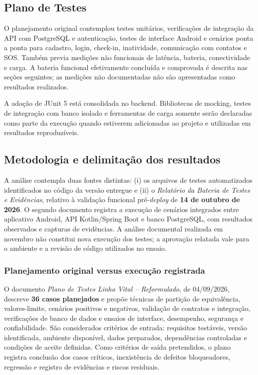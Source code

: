 \subsection{Plano de Testes}

O planejamento original contemplou testes unitários, verificações de integração da API com PostgreSQL e autenticação, testes de interface Android e cenários ponta a ponta para cadastro, login, check-in, inatividade, comunicação com contatos e SOS. Também previa medições não funcionais de latência, bateria, conectividade e carga. A bateria funcional efetivamente concluída e comprovada é descrita nas seções seguintes; as medições não documentadas não são apresentadas como resultados realizados.

A adoção de JUnit 5 está consolidada no backend. Bibliotecas de mocking, testes de integração com banco isolado e ferramentas de carga somente serão declaradas como parte da execução quando estiverem adicionadas ao projeto e utilizadas em resultados reproduzíveis.

\subsection{Metodologia e delimitação dos resultados}

A análise contempla duas fontes distintas: (i) os arquivos de testes automatizados identificados no código da versão entregue e (ii) o \emph{Relatório da Bateria de Testes e Evidências}, relativo à validação funcional pré-\textit{deploy} de \textbf{14 de outubro de 2026}. O segundo documento registra a execução de cenários integrados entre aplicativo Android, API Kotlin/Spring Boot e banco PostgreSQL, com resultados observados e capturas de evidências. A análise documental realizada em novembro não constitui nova execução dos testes; a aprovação relatada vale para o ambiente e a revisão de código utilizados no ensaio.

\subsubsection{Planejamento original versus execução registrada}

O documento \emph{Plano de Testes Linha Vital -- Reformulado}, de 04/09/2026, descreve \textbf{36 casos planejados} e propõe técnicas de partição de equivalência, valores-limite, cenários positivos e negativos, validação de contratos e integração, verificações de banco de dados e ensaios de interface, desempenho, segurança e confiabilidade. São considerados critérios de entrada: requisitos testáveis, versão identificada, ambiente disponível, dados preparados, dependências controladas e condições de aceite definidas. Como critérios de saída pretendidos, o plano registra conclusão dos casos críticos, inexistência de defeitos bloqueadores, regressão e registro de evidências e riscos residuais.


